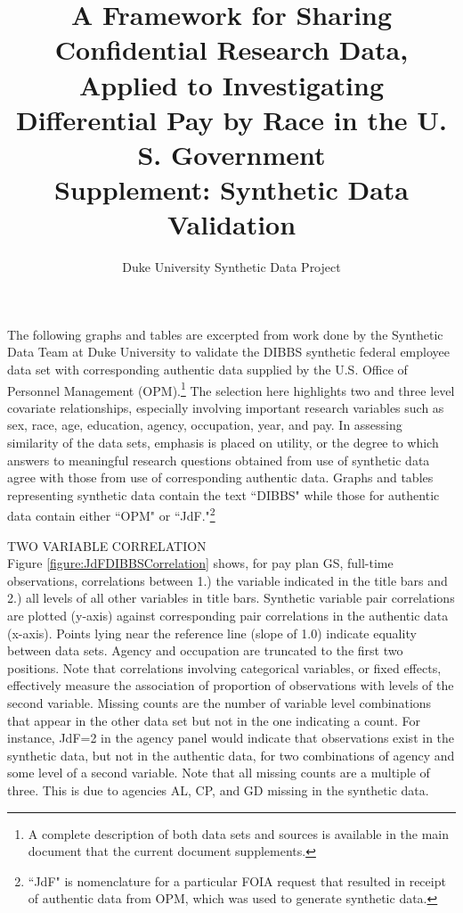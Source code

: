 \documentclass[10pt, letterpaper]{article}
\title{\Large A Framework for Sharing Confidential Research Data, Applied to Investigating Differential Pay by Race in the U. S. Government\\
\vspace{12pt} \Large Supplement:  Synthetic Data Validation}
\author{Duke University Synthetic Data Project}
\begin{document}
\begin{spacing}{1.0}

\maketitle

\vspace{20pt}

The following graphs and tables are excerpted from work done by the Synthetic Data Team at Duke University to validate the DIBBS synthetic federal employee data set with corresponding authentic data supplied by the U.S. Office of Personnel Management (OPM).\footnote{A complete description of both data sets and sources is available in the main document that the current document supplements.}  The selection here highlights two and three level covariate relationships, especially involving important research variables such as sex, race, age, education, agency, occupation, year, and pay.  In assessing similarity of the data sets, emphasis is placed on utility, or the degree to which answers to meaningful research questions obtained from use of synthetic data agree with those from use of corresponding authentic data.  Graphs and tables representing synthetic data contain the text ``DIBBS" while those for authentic data contain either ``OPM" or ``JdF."\footnote{``JdF" is nomenclature for a particular FOIA request that resulted in receipt of authentic data from OPM, which was used to generate synthetic data.}

\vspace{0.5in}

TWO VARIABLE CORRELATION\\

Figure \ref{figure:JdFDIBBSCorrelation} shows, for pay plan GS, full-time observations, correlations between 1.) the variable indicated in the title bars and 2.) all levels of all other variables in title bars.  Synthetic variable pair correlations are plotted (y-axis) against corresponding pair correlations in the authentic data (x-axis).  Points lying near the reference line (slope of 1.0) indicate equality between data sets.  Agency and occupation are truncated to the first two positions.  Note that correlations involving categorical variables, or fixed effects, effectively measure the association of proportion of observations with levels of the second variable.  Missing counts are the number of variable level combinations that appear in the other data set but not in the one indicating a count.  For instance, JdF=2 in the agency panel would indicate that observations exist in the synthetic data, but not in the authentic data, for two combinations of agency and some level of a second variable.  Note that all missing counts are a multiple of three.  This is due to agencies AL, CP, and GD missing in the synthetic data.\\


\end{spacing}
\end{document}
